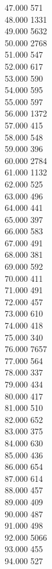 { 47.000	571 \\
 48.000	1331 \\
 49.000	5632 \\
 50.000	2768 \\
 51.000	547 \\
 52.000	617 \\
 53.000	590 \\
 54.000	595 \\
 55.000	597 \\
 56.000	1372 \\
 57.000	415 \\
 58.000	548 \\
 59.000	396 \\
 60.000	2784 \\
 61.000	1132 \\
 62.000	525 \\
 63.000	496 \\
 64.000	441 \\
 65.000	397 \\
 66.000	583 \\
 67.000	491 \\
 68.000	381 \\
 69.000	592 \\
 70.000	411 \\
 71.000	491 \\
 72.000	457 \\
 73.000	610 \\
 74.000	418 \\
 75.000	340 \\
 76.000	7657 \\
 77.000	564 \\
 78.000	337 \\
 79.000	434 \\
 80.000	417 \\
 81.000	510 \\
 82.000	652 \\
 83.000	375 \\
 84.000	630 \\
 85.000	436 \\
 86.000	654 \\
 87.000	614 \\
 88.000	457 \\
 89.000	409 \\
 90.000	487 \\
 91.000	498 \\
 92.000	5066 \\
 93.000	455 \\
 94.000	527 \\
}
